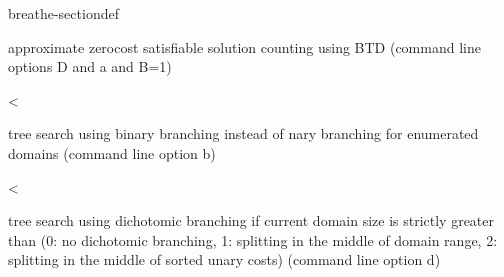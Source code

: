 \documentclass[letterpaper,10pt,openany,oneside,english]{sphinxmanual}
\begin{document}
\begin{fulllineitems}
\begin{sphinxuseclass}{breathe-sectiondef}
\begin{fulllineitems}
\sphinxAtStartPar
approximate zero\sphinxhyphen{}cost satisfiable solution counting using BTD (command line options \sphinxhyphen{}D and \sphinxhyphen{}a and \sphinxhyphen{}B=1) 

\end{fulllineitems}


\begin{fulllineitems}
\label{\detokenize{ref/ref_cpp:_CPPv4N8ToulBar219dichotomicBranchingE}}\label{\detokenize{ref/ref_cpp:_CPPv3N8ToulBar219dichotomicBranchingE}}\label{\detokenize{ref/ref_cpp:_CPPv2N8ToulBar219dichotomicBranchingE}}\label{\detokenize{ref/ref_cpp:ToulBar2::dichotomicBranching__i}}
\pysigstartsignatures
\pysigstartmultiline
{}
\pysigstopmultiline
\pysigstopsignatures
\sphinxAtStartPar
\textless{} 

\sphinxAtStartPar
tree search using binary branching instead of n\sphinxhyphen{}ary branching for enumerated domains (command line option \sphinxhyphen{}b) 

\end{fulllineitems}


\begin{fulllineitems}
\label{\detokenize{ref/ref_cpp:_CPPv4N8ToulBar223dichotomicBranchingSizeE}}\label{\detokenize{ref/ref_cpp:_CPPv3N8ToulBar223dichotomicBranchingSizeE}}\label{\detokenize{ref/ref_cpp:_CPPv2N8ToulBar223dichotomicBranchingSizeE}}\label{\detokenize{ref/ref_cpp:ToulBar2::dichotomicBranchingSize__unsigned-i}}
\pysigstartsignatures
\pysigstartmultiline
{}
\pysigstopmultiline
\pysigstopsignatures
\sphinxAtStartPar
\textless{} 

\sphinxAtStartPar
tree search using dichotomic branching if current domain size is strictly greater than {\hyperref[\detokenize{ref/ref_cpp:classToulBar2_1aaa4637681f9c80a6ea34f30e3956e7bf}]{}} (0: no dichotomic branching, 1: splitting in the middle of domain range, 2: splitting in the middle of sorted unary costs) (command line option \sphinxhyphen{}d) 


\end{fulllineitems}
\end{sphinxuseclass}
\end{fulllineitems}
\end{document}
